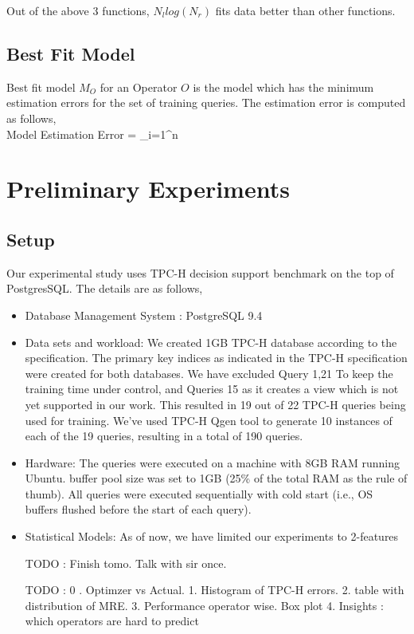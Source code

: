 \documentclass{article}
\begin{document}
\begin{multicols}{2}
	Out of the above 3 functions, $N_{l} log(N_{r})$ fits data better than other functions. 	
	\subsection{Best Fit Model}	
	Best fit model $M_{O}$ for an Operator $O$ is the model which has the minimum estimation errors 
	for the set of training queries. The estimation error is computed as follows,
	\\
	Model Estimation Error = \sum\limits_{i=1}^n 
	
	\section{Preliminary Experiments}
	\subsection{Setup}
	Our experimental study uses TPC-H decision support benchmark \cite{TPCH} on the top of 
	PostgresSQL. The details are as follows, 

	\begin{itemize}
	\item Database Management System : PostgreSQL 9.4
	\item Data sets and workload: We created 1GB TPC-H database
	according to the specification. The primary key indices as indicated
	in the TPC-H specification were created for both databases. We have excluded Query 1,21  
	To keep the training time under control, and Queries 15 as it creates a view which is not yet
	supported in our work. This resulted in 19 out of 22 TPC-H queries being used for training. We've 
	used TPC-H Qgen tool to generate 10 instances of each of the 19 queries, resulting in a total of 190 
	queries.
	
	\item Hardware: The queries were executed on a machine
	with 8GB RAM running Ubuntu. buffer pool size was set to 1GB (25\% of the total RAM as the rule
	of thumb). All queries were executed sequentially with cold start
	(i.e., OS buffers flushed before the start of each query).
	
	\item Statistical Models: As of now, we have limited our experiments to 2-features 
	
	
	TODO : Finish tomo. Talk with sir once.
	
	TODO : 
	0 . Optimzer vs Actual. 
	1. Histogram of TPC-H errors.
	2. table with distribution of MRE.
	3. Performance operator wise. Box plot
	4. Insights : which operators are hard to predict
	

\end{itemize}
\end{multicols}
\end{document}
